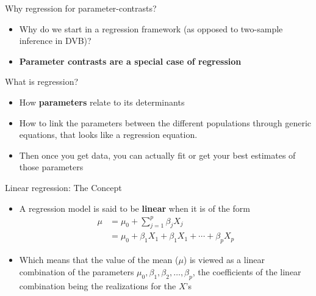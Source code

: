\documentclass[10pt,handout]{beamer}\usepackage[]{graphicx}\usepackage[]{color}
\begin{document}
\begin{frame}{Why regression for parameter-contrasts?}
	
	\begin{itemize}
		\setlength\itemsep{1.5em}
		\item Why do we start in a regression framework (as opposed to two-sample inference in DVB)?  
		\item \textbf{Parameter contrasts are a special case of regression}  
	\end{itemize}
	
\end{frame}


\begin{frame}{What is regression?}
	
	\begin{itemize}
		\setlength\itemsep{2em}
		\item How \textbf{parameters} relate to its determinants 
		\item How to link the parameters between the different populations through generic equations, that looks like a regression equation.  
		\item Then once you get data, you can actually fit or get your best estimates of those parameters
	\end{itemize}
	
\end{frame}

\begin{frame}{Linear regression: The Concept}
	
	\begin{itemize}
		\setlength\itemsep{2em}
		\item A regression model is said to be \textbf{linear} when it is of the form 
		\begin{align*}
			\mu & = \mu_0 + \sum_{j=1}^p \beta_j X_j \\
			& = \mu_0 + \beta_1 X_1 +  \beta_1 X_1 + \cdots +  \beta_p X_p
		\end{align*}
		
		\item Which means that the value of the mean ($\mu$) is viewed as a linear combination of the parameters $\mu_0, \beta_1, \beta_2, \ldots, \beta_p$, the coefficients of the linear combination being the realizations for the $X$'s
		
	\end{itemize}
	
\end{frame}
\end{document}
